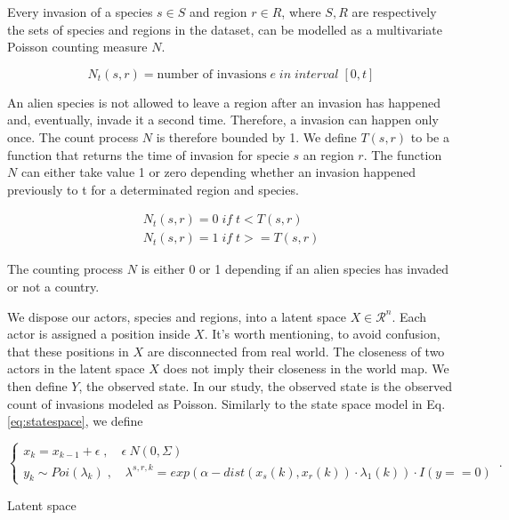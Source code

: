 \documentclass[mscthesis]{usiinfthesis}
\begin{document}

Every invasion of a species $s \in S$ and region $r \in R$, where $S, R$ are respectively the sets of species and regions in the dataset, can be modelled as a multivariate Poisson counting measure  $N$.

\[
N_t(s, r) = \textrm{number of invasions} \; e \; in \; interval \; [0, t]
\]

An alien species is not allowed to leave a region after an invasion has happened and, eventually, invade it a second time. Therefore, a invasion can happen only once. The count process $N$ is therefore bounded by 1. We define $T(s, r)$ to be a function that returns the time of invasion for specie $s$ an region $r$. The function $N$ can either take value 1 or zero depending whether an invasion happened previously to t for a determinated region and species.


\begin{eqfloat}
\begin{equation}
\begin{array}{l}
N_t(s, r) = 0 \; if \; t < T(s, r) \\
N_t(s, r) = 1 \; if \; t >= T(s, r)
\end{array}
\label{eq:counting process}
\end{equation}
\caption{The counting process $N$ is either 0 or 1 depending if an alien species has invaded or not a country.}
\end{eqfloat}


We dispose our actors, species and regions, into a latent space $X \in \mathcal{R}^n$. Each actor is assigned a position inside $X$. It's worth mentioning, to avoid confusion, that these positions in $X$ are disconnected from real world. The closeness of two actors in the latent space $X$ does not imply their closeness in the world map. We then define $Y$, the observed state. In our study, the observed state is the observed count of invasions modeled as Poisson. Similarly to the state space model in Eq. \ref{eq:statespace}, we define
\begin{eqfloat}
\begin{equation}
    \begin{cases}
      x_k = x_{k-1} + \epsilon \; , \quad \epsilon ~ N(0, \Sigma) \\
      y_k \sim Poi(\lambda_k) \; , \quad \lambda^{s, r, k} = exp\left(\alpha-dist(x_s(k), x_r(k)) \cdot \lambda_1(k) \right) \cdot I(y == 0)
    \end{cases}\,.
\label{eq:latentspace}
\end{equation}
\caption{Latent space}
\end{eqfloat}
\end{document}

